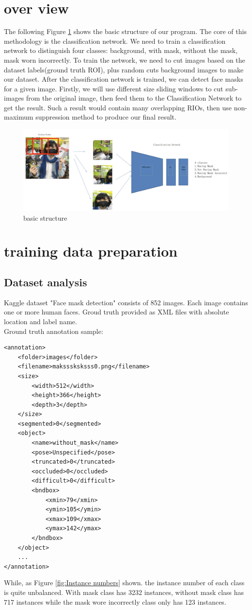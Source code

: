 \documentclass[10pt,a4paper]{report}
\begin{document}
\section{over view}
The following Figure \ref{fig:Basic Structure} shows the basic structure of our program. The core of this methodology is the classification network. We need to train a classification network to distinguish four classes: background, with mask, without the mask, mask worn incorrectly. To train the network, we need to cut images based on the dataset labels(ground truth ROI), plus random cuts background images to make our dataset. After the classification network is trained, we can detect face masks for a given image. Firstly, we will use different size sliding windows to cut sub-images from the original image, then feed them to the Classification Network to get the result. Such a result would contain many overlapping RIOs, then use non-maximum suppression method to produce our final result.
\begin{figure}[hbtp]

\centering
\includegraphics[scale=0.14]{imgs/workflow.png}
\caption{basic structure}
        \label{fig:Basic Structure}
\end{figure}

\section{training data preparation}
\subsection{Dataset analysis}
Kaggle dataset "Face mask detection" consists of 852 images. Each image contains one or more human faces. Groud truth provided as XML files with absolute location and label name. \\
Ground truth annotation sample:
\begin{lstlisting}
<annotation>
	<folder>images</folder>
	<filename>maksssksksss0.png</filename>
	<size>
		<width>512</width>
		<height>366</height>
		<depth>3</depth>
	</size>
	<segmented>0</segmented>
	<object>
		<name>without_mask</name>
		<pose>Unspecified</pose>
		<truncated>0</truncated>
		<occluded>0</occluded>
		<difficult>0</difficult>
		<bndbox>
			<xmin>79</xmin>
			<ymin>105</ymin>
			<xmax>109</xmax>
			<ymax>142</ymax>
		</bndbox>
	</object>
	...
</annotation>
\end{lstlisting}
While, as Figure \ref{fig:Instance numbers} shown. the instance number of each class is quite unbalanced. With mask class has 3232 instances, without mask class has 717 instances while the mask wore incorrectly class only has 123 instances. 
\end{document}
